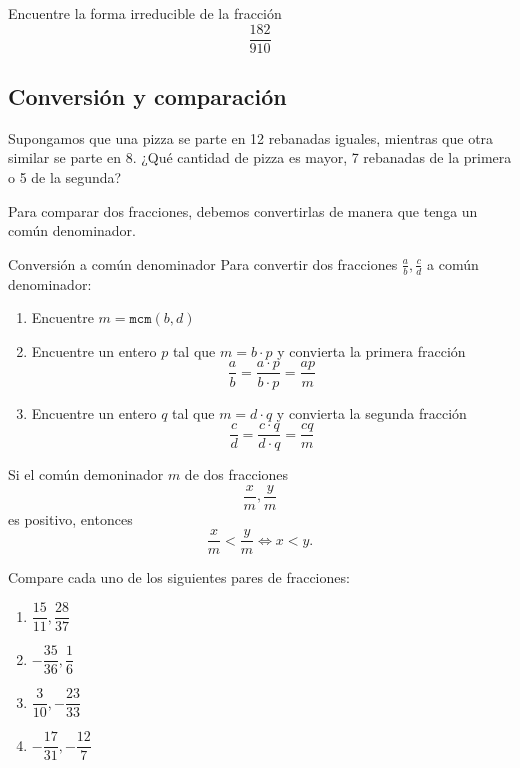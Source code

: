 	\begin{problema}
		Encuentre la forma irreducible de la fracci\'on $$\dfrac{182}{910}$$
	\end{problema}
	



\subsection{Conversi\'on y comparaci\'on}


	Supongamos que una pizza se parte en 12 rebanadas iguales, mientras que otra similar se parte en 8. ¿Qu\'e cantidad de pizza es mayor, 7 rebanadas de la primera o 5 de la segunda?



	Para comparar dos fracciones, debemos convertirlas de manera que tenga un común denominador. 



	\begin{algoritmo}{Conversi\'on a común denominador}
		Para convertir dos fracciones $\frac{a}{b}, \frac{c}{d}$ a común denominador:
		\begin{enumerate}
			\item Encuentre $m=\texttt{mcm}(b,d)$
			\item Encuentre un entero $p$ tal que $m=b\cdot p$ y convierta la primera fracci\'on
			$$
			\dfrac{a}{b}=\dfrac{a\cdot p}{b \cdot p}=\dfrac{ap}{m}
			$$
			\item Encuentre un entero $q$ tal que $m=d\cdot q$ y convierta la segunda fracci\'on
			$$
			\dfrac{c}{d}=\dfrac{c\cdot q}{d \cdot q}=\dfrac{cq}{m}
			$$
		\end{enumerate}
		
	\end{algoritmo}
	



	\begin{observacion}
		Si el común demoninador $m$ de dos fracciones $$\dfrac{x}{m}, \dfrac{y}{m}$$ es positivo, entonces
		$$
		\dfrac{x}{m} < \frac{y}{m} \iff x < y.
		$$
	\end{observacion}
	




	\begin{problema}
		Compare cada uno de los siguientes pares de fracciones:
		\begin{enumerate}
			\item $\dfrac{15}{11}, \dfrac{28}{37}$ 
			\item $-\dfrac{35}{36}, \dfrac{1}{6}$
			\item $\dfrac{3}{10}, -\dfrac{23}{33}$
			\item $-\dfrac{17}{31}, -\dfrac{12}{7}$
		\end{enumerate}
		
	\end{problema}


